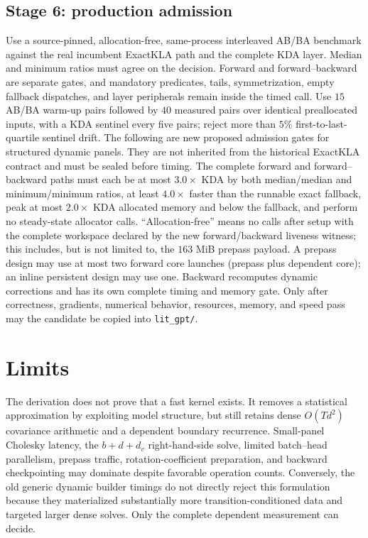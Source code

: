 \documentclass[11pt]{article}
\begin{document}
\subsection{Stage 6: production admission}

Use a source-pinned, allocation-free, same-process interleaved AB/BA benchmark against the real
incumbent ExactKLA path and the complete KDA layer.  Median and minimum ratios must agree on the
decision.  Forward and forward--backward are separate gates, and mandatory predicates, tails,
symmetrization, empty fallback dispatches, and layer peripherals remain inside the timed call.
Use $15$ AB/BA warm-up pairs followed by $40$ measured pairs over identical preallocated inputs,
with a KDA sentinel every five pairs; reject more than $5\%$ first-to-last-quartile sentinel drift.
The following are new proposed admission gates for structured dynamic panels.  They are not
inherited from the historical ExactKLA contract and must be sealed before timing.  The complete
forward and forward--backward paths must each be at most $3.0\times$ KDA by both
median/median and minimum/minimum ratios, at least $4.0\times$ faster than the runnable exact
fallback, peak at most $2.0\times$ KDA allocated memory and below the fallback, and perform no
steady-state allocator calls.  ``Allocation-free'' means no calls after setup with the complete
workspace declared by the new forward/backward liveness witness; this includes, but is not limited
to, the $163$ MiB prepass payload.  A prepass design may use at most two forward core
launches (prepass plus dependent core); an inline persistent design may use one.  Backward
recomputes dynamic corrections and has its own complete timing and memory gate.
Only after correctness, gradients, numerical behavior, resources, memory, and speed pass may the
candidate be copied into \texttt{lit\_gpt/}.

\section{Limits}

The derivation does not prove that a fast kernel exists.  It removes a statistical approximation
by exploiting model structure, but still retains dense $O(Td^2)$ covariance arithmetic and a
dependent boundary recurrence.  Small-panel Cholesky latency, the $b+d+d_v$ right-hand-side solve,
limited batch--head parallelism, prepass traffic, rotation-coefficient preparation,
and backward checkpointing may dominate despite favorable operation counts.  Conversely, the
old generic dynamic builder timings do not directly reject this formulation because they
materialized substantially more transition-conditioned data and targeted larger dense solves.
Only the complete dependent measurement can decide.
\end{document}
